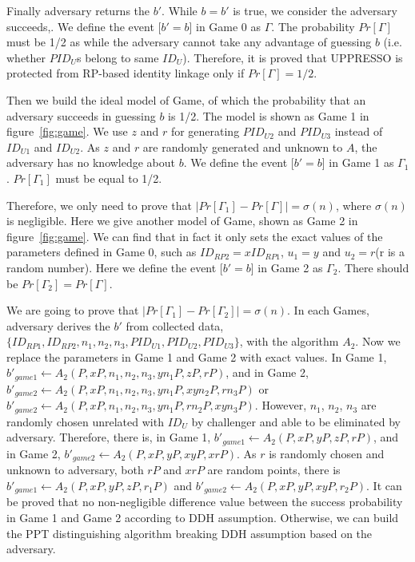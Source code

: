 Finally adversary returns the $b'$. While $b=b'$ is true, we consider the adversary succeeds,.
We define the event [$b'=b$] in Game 0 as $\Gamma$. The probability $Pr[\Gamma]$ must be 1/2 as while the adversary cannot take any advantage of guessing $b$ (i.e.  whether $PID_U$s belong to same $ID_U$). Therefore, it is proved that UPPRESSO is protected from RP-based identity linkage only if $Pr[\Gamma]=1/2$.

Then we build the ideal model of Game, of which the probability  that an adversary succeeds in guessing $b$ is 1/2. The model is shown as Game 1 in figure~\ref{fig:game}. We use $z$ and $r$ for generating $PID_{U2}$ and $PID_{U3}$ instead of $ID_{U1}$ and $ID_{U2}$. As $z$ and $r$ are randomly generated and unknown to $A$, the adversary has no knowledge about $b$. We  define the event [$b'=b$] in Game 1 as $\Gamma_1$. $Pr[\Gamma_1]$ must be equal to 1/2. 

Therefore, we only need to prove that $|Pr[\Gamma_1]-Pr[\Gamma]|=\sigma(n)$, where $\sigma(n)$ is negligible. Here we give another model of Game, shown as Game 2 in figure~\ref{fig:game}. We can find that in fact it only sets the exact values of the parameters defined in Game 0, such as $ID_{RP2}=xID_{RP1}$, $u_1=y$ and $u_2=r$(r is a random number).  Here we define the event [$b'=b$] in Game 2 as $\Gamma_2$. There should be $Pr[\Gamma_2]=Pr[\Gamma]$.

We are going to prove that $|Pr[\Gamma_1]-Pr[\Gamma_2]|=\sigma(n)$. In each Games, adversary derives the $b'$ from collected data, $\{ID_{RP1},ID_{RP2},n_1,n_2,n_3,PID_{U1},PID_{U2},PID_{U3}\}$, with the algorithm $A_2$. Now we replace the parameters in Game 1 and Game 2 with exact values. In Game 1, $b'_{game1}\gets A_2(P,xP,n_1,n_2,n_3,yn_1P,zP,rP)$, and in Game 2, $b'_{game2}\gets A_2(P,xP,n_1,n_2,n_3,yn_1P,xyn_2P,rn_3P)$ or $b'_{game2}\gets A_2(P,xP,n_1,n_2,n_3,yn_1P,rn_2P,xyn_3P)$. 
However, $n_1$, $n_2$, $n_3$ are randomly chosen unrelated with $ID_U$ by challenger and able to be eliminated by adversary. Therefore, there is, in Game 1, $b'_{game1}\gets A_2(P,xP,yP,zP,rP)$, and in Game 2, $b'_{game2}\gets A_2(P,xP,yP,xyP,xrP)$. As $r$ is randomly chosen and unknown to adversary, both $rP$ and $xrP$ are random points, there is $b'_{game1}\gets A_2(P,xP,yP,zP,r_1P)$ and $b'_{game2}\gets A_2(P,xP,yP,xyP,r_2P)$.  It can be proved that no non-negligible difference value between the success probability in Game 1 and Game 2 according to DDH assumption. Otherwise, we can build the PPT distinguishing algorithm breaking DDH assumption based on the adversary. 

